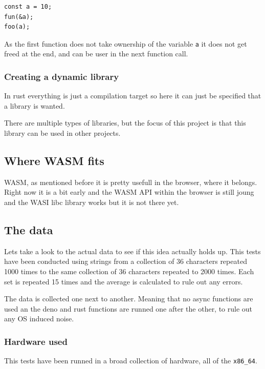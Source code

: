 \documentclass[12pt, letterpaper]{article}
\begin{document}
\begin{multicols}{2}
    \begin{lstlisting}
const a = 10;
fun(&a);
foo(a);
    \end{lstlisting}

    As the first function does not take ownership of the variable \verb|a| it does not get freed at the end, and can be user in the next function call.

    \subsubsection{Creating a dynamic library}

    In rust everything is just a compilation target so here it can just be specified that a library is wanted.

    There are multiple types of libraries, but the focus of this project is that this library can be used in other projects.

    \subsection{Where WASM fits}

    WASM, as mentioned before it is pretty usefull in the browser, where it belongs. Right now it is a bit early and the WASM API within the browser is still joung and the WASI libc library works but it is not there yet.

    \subsection{The data}

    Lets take a look to the actual data to see if this idea actually holds up. This tests have been conducted using strings from a collection of 36 characters repeated 1000 times to the same collection of 36 characters repeated to 2000 times. Each set is repeated 15 times and the average is calculated to rule out any errors.

    The data is collected one next to another. Meaning that no async functions are used an the deno and rust functions are runned one after the other, to rule out any OS induced noise.

    \subsubsection{Hardware used}

    This tests have been runned in a broad collection of hardware, all of the \verb|x86_64|.


\end{multicols}
\end{document}
